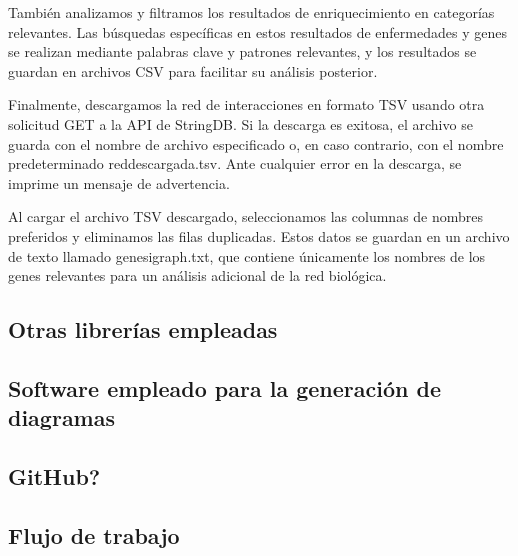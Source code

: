 También analizamos y filtramos los resultados de enriquecimiento en categorías relevantes. Las búsquedas específicas en estos resultados de enfermedades y genes se realizan mediante palabras clave y patrones relevantes, y los resultados se guardan en archivos CSV para facilitar su análisis posterior.

Finalmente, descargamos la red de interacciones en formato TSV usando otra solicitud GET a la API de StringDB. Si la descarga es exitosa, el archivo se guarda con el nombre de archivo especificado o, en caso contrario, con el nombre predeterminado reddescargada.tsv. Ante cualquier error en la descarga, se imprime un mensaje de advertencia.

Al cargar el archivo TSV descargado, seleccionamos las columnas de nombres preferidos y eliminamos las filas duplicadas. Estos datos se guardan en un archivo de texto llamado genesigraph.txt, que contiene únicamente los nombres de los genes relevantes para un análisis adicional de la red biológica.








\subsection{Otras librerías empleadas}

\subsection{Software empleado para la generación de diagramas}

\subsection{GitHub?}

\subsection{Flujo de trabajo}
